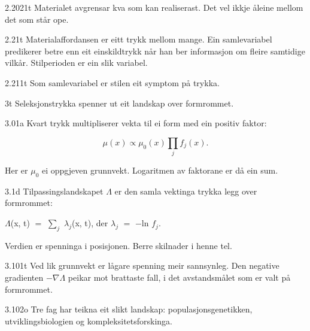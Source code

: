 \begin{formproposition}{2.2021}{t}
Materialet avgrensar kva som kan realiserast. Det vel ikkje åleine mellom det som står ope.
\end{formproposition}

\begin{formproposition}{2.21}{t}
Materialaffordansen er eitt trykk mellom mange. Ein samlevariabel predikerer betre enn eit einskildtrykk når han ber informasjon om fleire samtidige vilkår. Stilperioden er ein slik variabel.
\end{formproposition}

\begin{formproposition}{2.211}{t}
Som samlevariabel er stilen eit symptom på trykka.
\end{formproposition}

\begin{formproposition}{3}{t}
Seleksjonstrykka spenner ut eit landskap over formrommet.
\end{formproposition}

\begin{formproposition}{3.01}{a}
Kvart trykk multipliserer vekta til ei form med ein positiv faktor:

\[
\mu(x)\propto\mu_0(x)\prod_j f_j(x).
\]

Her er \(\mu_0\) ei oppgjeven grunnvekt. Logaritmen av faktorane er då ein sum.
\end{formproposition}

\begin{formproposition}{3.1}{d}
Tilpassingslandskapet \(Λ\) er den samla vektinga trykka legg over formrommet:

\(Λ\)(x, t) \(=\) \(∑_{j}\) \(λ_{j}\)(x, t), der \(λ_{j}\) \(=\) \(−\)ln \(f_{j}\).

Verdien er spenninga i posisjonen. Berre skilnader i henne tel.
\end{formproposition}

\begin{formproposition}{3.101}{t}
Ved lik grunnvekt er lågare spenning meir sannsynleg. Den negative gradienten \(−\)\(∇\)\(Λ\) peikar mot brattaste fall, i det avstandsmålet som er valt på formrommet.
\end{formproposition}

\begin{formproposition}{3.102}{o}
Tre fag har teikna eit slikt landskap: populasjonsgenetikken, utviklingsbiologien og kompleksitetsforskinga.
\end{formproposition}

